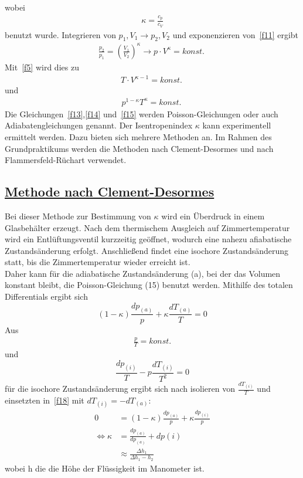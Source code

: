 \documentclass[11pt,a4paper]{article}
\begin{document}
 wobei
 \begin{align}
     \label{f12}
     \kappa = \frac{c_{p}}{c_{V}} 
 \end{align}
 benutzt wurde. Integrieren von $p_{1},V_{1} \rightarrow p_{2},V_{2}$ und exponenzieren
 von~\eqref{f11} ergibt
 \begin{align}
     \label{f13}
     \frac{p_{2}}{p_{1}} = {\left(\frac{V_{1}}{V_{2}}\right)}^{\kappa} \rightarrow
     p \cdot {V}^{\kappa} = konst.\
 \end{align}
 Mit~\eqref{f5} wird dies zu
 \begin{align}
     \label{f14}
     T\cdot{V}^{\kappa-1}=konst.\
 \end{align}
 und
 \begin{align}
     \label{f15}
     {p}^{1-\kappa}{T}^{\kappa}=konst.\
 \end{align}
 Die Gleichungen~\eqref{f13},\eqref{f14} und~\eqref{f15} werden Poisson-Gleichungen
 oder auch Adiabatengleichungen genannt. Der Isentropenindex $\kappa$ kann experimentell
 ermittelt werden. Dazu bieten sich mehrere Methoden an. Im Rahmen des Grundpraktikums
 werden die Methoden nach Clement-Desormes und nach Flammersfeld-R\"uchart verwendet. 
 \newpage
 \subsection{\underline{Methode nach Clement-Desormes}}
 Bei dieser Methode zur Bestimmung von $\kappa$ wird ein \"Uberdruck in einem
 Glasbeh\"alter erzeugt. Nach dem thermischem Ausgleich auf Zimmertemperatur wird ein
 Entl\"uftungsventil kurzzeitig ge\"offnet, wodurch eine nahezu afiabatische
 Zustands\"anderung erfolgt. Anschlie{\ss}end findet eine isochore Zustands\"anderung
 statt, bis die Zimmertemperatur wieder erreicht ist. \\
  Daher kann für die adiabatische Zustandsänderung (a), bei der das Volumen konstant bleibt, die Poisson-Gleichung (15) benutzt werden. Mithilfe des totalen Differentials ergibt sich
\begin{equation}
    \label{f16}
  (1-\kappa)\frac{dp_{(a)}}{p} + \kappa \frac{dT_{(a)}}{T} = 0
\end{equation}
Aus
\begin{align}
    \label{f17}
  \frac{p}{T} = konst.
\end{align}
und
\begin{equation}
    \label{f18}
  \frac{dp_{(i)}}{T}-p\frac{dT_{(i)}}{T^2}=0
\end{equation}
für die isochore Zustandsänderung ergibt sich nach isolieren von $\frac{dT_{(i)}}{T}$ und einsetzten in~\eqref{f18} mit $dT_{(i)}=-dT_{(a)}$:
\begin{align}
    0 & = (1-\kappa)\frac{dp_{(a)}}{p} + \kappa \frac{dp_{(i)}}{p}  \\
  \Leftrightarrow
  \kappa & = \frac{dp_{(a)}}{dp_{(a)}}+dp{(i)} \\
  &\approx \frac{\Delta h_{1}}{\Delta h_{1}-h_{2}}
\end{align}
wobei h die die H\"ohe der Fl\"ussigkeit im Manometer ist.
  \newpage
\end{document}
